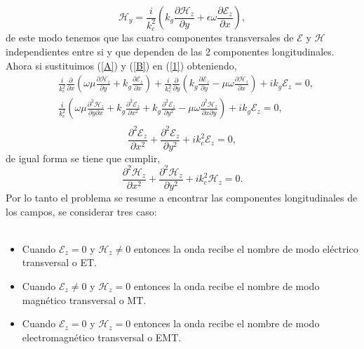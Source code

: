 \documentclass[11pt,fleqn]{book} %
\begin{document}
 \begin{equation}  \label{D}
 \mathcal{H}_y= \frac{i}{k_c^2} \left(k_g \frac{\partial \mathcal{H}_z }{\partial y}+\epsilon\omega\frac{\partial \mathcal{E}_z}{\partial x} \right),
 \end{equation}
 de este modo tenemos que las cuatro componentes transversales de $\mathcal{E}$ y $\mathcal{H}$ independientes entre si y que dependen de las 2 componentes longitudinales. Ahora  si sustituimos (\ref{A}) y (\ref{B}) en (\ref{1}) obteniendo,
 \begin{equation*}
 \begin{split}
 & \frac{i}{k_c^2}\frac{\partial}{\partial x} \left(\omega \mu \frac{\partial \mathcal{H}_z }{\partial y}+k_g\frac{\partial \mathcal{E}_z}{\partial x} \right)+\frac{i}{k_c^2}\frac{\partial }{\partial y} \left(k_g \frac{\partial \mathcal{E}_z }{\partial y}-\mu\omega\frac{\partial \mathcal{H}_z}{\partial x} \right)+ik_g\mathcal{E}_z=0,\\
  & \frac{i}{k_c^2} \left(  \omega \mu \frac{\partial^2 \mathcal{H}_z }{\partial y\partial x}+k_g\frac{\partial^2 \mathcal{E}_z}{\partial x^2}+ k_g \frac{\partial^2 \mathcal{E}_z }{\partial y^2}-\mu\omega\frac{\partial^2 \mathcal{H}_z}{\partial x\partial y} \right)+ik_g\mathcal{E}_z=0,\\
 \end{split}
 \end{equation*}
 \begin{equation}
 \frac{\partial^2 \mathcal{E}_z}{\partial x^2}+  \frac{\partial^2 \mathcal{E}_z }{\partial y^2}+ik_c^2\mathcal{E}_z=0,
 \end{equation}
 de igual forma se tiene que cumplir,
 \begin{equation}
 \frac{\partial^2 \mathcal{H}_z}{\partial x^2}+  \frac{\partial^2 \mathcal{H}_z }{\partial y^2}+ik_c^2\mathcal{H}_z=0.
 \end{equation}
 Por lo tanto el problema se resume a encontrar las componentes longitudinales de los campos, se considerar tres caso:\\\\
 \begin{itemize}
 \item Cuando $\mathcal{E}_z=0$ y $ \mathcal{H}_z\neq0$ entonces la onda recibe el nombre de modo el\'ectrico transversal o ET.\\

 \item Cuando $\mathcal{E}_z\neq0$ y $ \mathcal{H}_z=0$ entonces la onda recibe el nombre de modo magn\'etico transversal o MT.\\

 \item Cuando $\mathcal{E}_z=0$ y $ \mathcal{H}_z=0$ entonces la onda recibe el nombre de modo electromagn\'etico transversal o EMT.\\

 \end{itemize}
\end{document}
